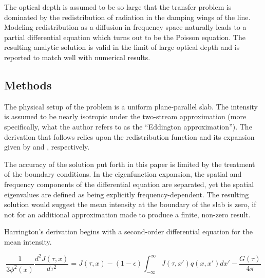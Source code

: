 \documentclass[onecolumn]{aastex63}
\begin{document}
The optical depth is assumed to be so large that the transfer problem is dominated by the redistribution of radiation in the damping wings of the line. Modeling redistribution as a diffusion in frequency space naturally leads to a partial differential equation which turns out to be the Poisson equation. The resulting analytic solution is valid in the limit of large optical depth and is reported to match well with numerical results.

\subsection{Methods}
The physical setup of the problem is a uniform plane-parallel slab. The intensity is assumed to be nearly isotropic under the two-stream approximation (more specifically, what the author refers to as the ``Eddington approximation''). The derivation that follows relies upon the redistribution function and its expansion given by \cite{hummer1962} and \cite{1972ApJ...174..439A}, respectively. 

The accuracy of the solution put forth in this paper is limited by the treatment of the boundary conditions. In the eigenfunction expansion, the spatial and frequency components of the differential equation are separated, yet the spatial eigenvalues are defined as being explicitly frequency-dependent. The resulting solution would suggest the mean intensity at the boundary of the slab is zero, if not for an additional approximation made to produce a finite, non-zero result.


Harrington's derivation begins with a second-order differential equation for the mean intensity.

\begin{equation} \label{harrington1}
    \frac{1}{3\phi^2(x)}\frac{d^2J(\tau, x)}{d\tau^2} = J(\tau, x) - (1-\epsilon)\int_{-\infty}^{\infty}J(\tau, x')q(x, x')dx' - \frac{G(\tau)}{4\pi}
\end{equation}
\end{document}
